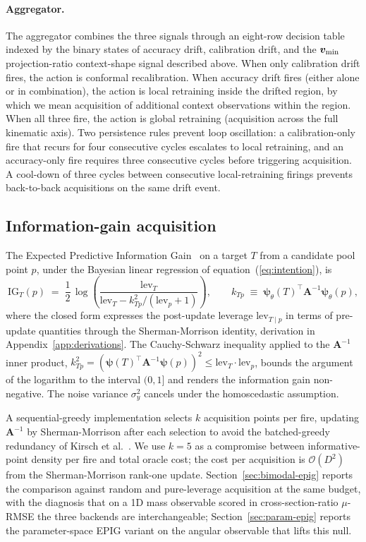 \documentclass[11pt,a4paper]{article}
\newcommand{\Ainv}{\bm{A}^{-1}}
\newcommand{\psib}{\bm{\psi}}
\begin{document}
\paragraph{Aggregator.}
The aggregator combines the three signals through an eight-row decision table indexed by the binary states of accuracy drift, calibration drift, and the $\bm{v}_{\rm min}$ projection-ratio context-shape signal described above. When only calibration drift fires, the action is conformal recalibration. When accuracy drift fires (either alone or in combination), the action is local retraining inside the drifted region, by which we mean acquisition of additional context observations within the region. When all three fire, the action is global retraining (acquisition across the full kinematic axis). Two persistence rules prevent loop oscillation: a calibration-only fire that recurs for four consecutive cycles escalates to local retraining, and an accuracy-only fire requires three consecutive cycles before triggering acquisition. A cool-down of three cycles between consecutive local-retraining firings prevents back-to-back acquisitions on the same drift event.

\subsection{Information-gain acquisition}
\label{sec:loop:epig}

The Expected Predictive Information Gain~\cite{Smith:2023epig} on a target $T$ from a candidate pool point $p$, under the Bayesian linear regression of equation~(\ref{eq:intention}), is
\begin{equation}
  \mathrm{IG}_T(p) \;=\; \frac{1}{2}\,\log\!\left(\frac{\mathrm{lev}_T}{\mathrm{lev}_T - k_{Tp}^2 / (\mathrm{lev}_p + 1)}\right), \qquad k_{Tp} \;\equiv\; \psib_\theta(T)^\top \bm{A}^{-1} \psib_\theta(p),
  \label{eq:epig}
\end{equation}
where the closed form expresses the post-update leverage $\mathrm{lev}_{T \mid p}$ in terms of pre-update quantities through the Sherman-Morrison identity, derivation in Appendix~\ref{app:derivations}. The Cauchy-Schwarz inequality applied to the $\Ainv$ inner product, $k_{Tp}^2 = (\psib(T)^\top \Ainv \psib(p))^2 \leq \mathrm{lev}_T \cdot \mathrm{lev}_p$, bounds the argument of the logarithm to the interval $(0, 1]$ and renders the information gain non-negative. The noise variance $\sigma_y^2$ cancels under the homoscedastic assumption.

A sequential-greedy implementation selects $k$ acquisition points per fire, updating $\Ainv$ by Sherman-Morrison after each selection to avoid the batched-greedy redundancy of Kirsch et al.~\cite{Kirsch:2019batchbald}. We use $k = 5$ as a compromise between informative-point density per fire and total oracle cost; the cost per acquisition is $\mathcal{O}(D^2)$ from the Sherman-Morrison rank-one update. Section~\ref{sec:bimodal-epig} reports the comparison against random and pure-leverage acquisition at the same budget, with the diagnosis that on a 1D mass observable scored in cross-section-ratio $\mu$-RMSE the three backends are interchangeable; Section~\ref{sec:param-epig} reports the parameter-space EPIG variant on the angular observable that lifts this null.
\end{document}
